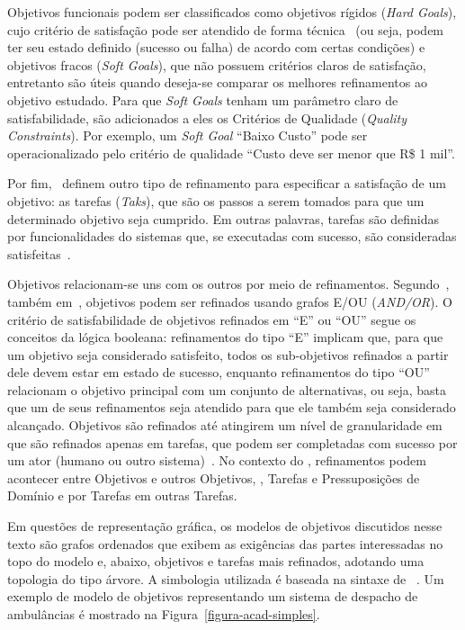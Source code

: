 Objetivos funcionais podem ser classificados como objetivos rígidos (\textit{Hard Goals}), cujo critério de satisfação pode ser atendido de forma técnica~\cite{dardenne1993goal} (ou seja, podem ter seu estado definido (sucesso ou falha) de acordo com certas condições) e objetivos fracos (\textit{Soft Goals}), que não possuem critérios claros de satisfação, entretanto são úteis quando deseja-se comparar os melhores refinamentos ao objetivo estudado. Para que \textit{Soft Goals} tenham um parâmetro claro de satisfabilidade, são adicionados a eles os Critérios de Qualidade (\textit{Quality Constraints}). Por exemplo, um \textit{Soft Goal} ``Baixo Custo'' pode ser operacionalizado pelo critério de qualidade ``Custo deve ser menor que R\$ 1 mil''.

Por fim,~ definem outro tipo de refinamento para especificar a satisfação de um objetivo: as tarefas (\textit{Taks}), que são os passos a serem tomados para que um determinado objetivo seja cumprido. Em outras palavras, tarefas são definidas por funcionalidades do sistemas que, se executadas com sucesso, são consideradas satisfeitas~\cite{souza2012requirement}.

Objetivos relacionam-se uns com os outros por meio de refinamentos. Segundo~, também em~\cite{dardenne1993goal}, objetivos podem ser refinados usando grafos E/OU (\textit{AND/OR}). O critério de satisfabilidade de objetivos refinados em ``E'' ou ``OU'' segue os conceitos da lógica booleana: refinamentos do tipo ``E'' implicam que, para que um objetivo seja considerado satisfeito, todos os sub-objetivos refinados a partir dele devem estar em estado de sucesso, enquanto refinamentos do tipo ``OU'' relacionam o objetivo principal com um conjunto de alternativas, ou seja, basta que um de seus refinamentos seja atendido para que ele também seja considerado alcançado. Objetivos são refinados até atingirem um nível de granularidade em que são refinados apenas em tarefas, que podem ser completadas com sucesso por um ator (humano ou outro sistema)~\cite{souza2013awareness}. No contexto do \zanshin, refinamentos podem acontecer entre Objetivos e outros Objetivos, \sofgoals, Tarefas e Pressuposições de Domínio e por Tarefas em outras Tarefas.

Em questões de representação gráfica, os modelos de objetivos discutidos nesse texto são grafos ordenados que exibem as exigências das partes interessadas no topo do modelo e, abaixo, objetivos e tarefas mais refinados, adotando uma topologia do tipo árvore. A simbologia utilizada é baseada na sintaxe de \istar~\cite{yu20111}. Um exemplo de modelo de objetivos representando um sistema de despacho de ambulâncias é mostrado na Figura~\ref{figura-acad-simples}.

